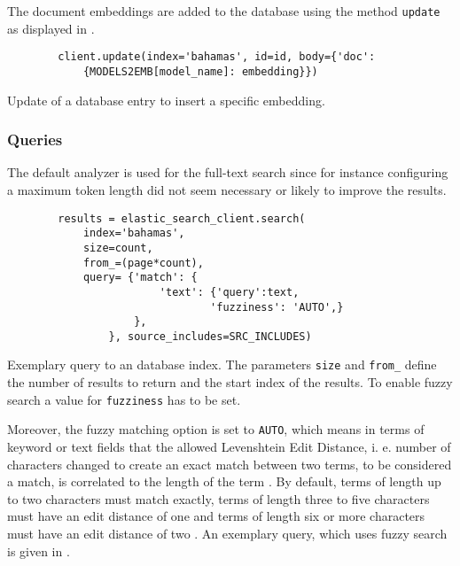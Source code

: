 The document embeddings are added to the database using the method \texttt{update} as displayed in .

\begin{listing}[htp]
    \begin{verbatim}
        client.update(index='bahamas', id=id, body={'doc': 
            {MODELS2EMB[model_name]: embedding}})
    \end{verbatim}
    \caption[Update of a database entry]
    {Update of a database entry to insert a specific embedding.
    }
    \label{lst:db_Pool_update}
\end{listing}


\subsubsection*{Queries}
The default analyzer is used for the full-text search since for instance configuring a maximum token length did not seem necessary or likely to improve the results.

\begin{listing}[htp]
    \begin{verbatim}
        results = elastic_search_client.search(
            index='bahamas', 
            size=count,
            from_=(page*count),
            query= {'match': {
                        'text': {'query':text,
                                'fuzziness': 'AUTO',}
                    }, 
                }, source_includes=SRC_INCLUDES)
    \end{verbatim}
    \caption[Query to an \databaseName{} database index]{Exemplary query to an \databaseName{} database index.
    The parameters \texttt{size} and \texttt{from\_} define the number of results to return and the start index of the results.
    To enable fuzzy search a value for \texttt{fuzziness} has to be set. 
    }
    \label{lst:fuzzy_query}
\end{listing}

Moreover, the fuzzy matching option is set to \texttt{AUTO}, which means in terms of keyword or text fields that the allowed Levenshtein Edit Distance, 
i. e. number of characters changed to create an exact match between two terms, to be considered a match, is correlated to the length of the term \cite{Elasticsearch-fuzziness}.
By default, terms of length up to two characters must match exactly, terms of length three to five characters must have an edit distance of one and 
terms of length six or more characters must have an edit distance of two \cite{Elasticsearch-fuzziness}.
An exemplary query, which uses fuzzy search is given in .

